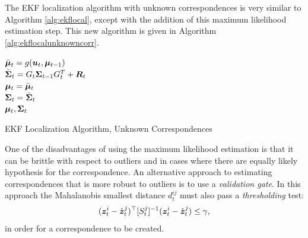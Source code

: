 The EKF localization algorithm with unknown correspondences is very similar to Algorithm \ref{alg:ekflocal}, except with the addition of this maximum likelihood estimation step. This new algorithm is given in Algorithm \ref{alg:ekflocalunknowncorr}.
\begin{algorithm}[ht]
 $\bar{\bm{\mu}}_t = g(\bm{u}_t,\bm{\mu}_{t-1})$\\
 $\bar{\bm{\Sigma}}_t = G_t\bm{\Sigma}_{t-1} G_t^{T} + \bm{R}_t$\\
 $\bm{\mu}_t = \bar{\bm{\mu}}_t$\\
 $\bm{\Sigma}_t = \bar{\bm{\Sigma}}_t$\\
 \Return $\bm{\mu}_t, \bm{\Sigma}_t$
 \caption{EKF Localization Algorithm, Unknown Correspondences}
 \label{alg:ekflocalunknowncorr}
\end{algorithm}


One of the disadvantages of using the maximum likelihood estimation is that it can be brittle with respect to outliers and in cases where there are equally likely hypothesis for the correspondence.
An alternative approach to estimating correspondences that is more robust to outliers is to use a \textit{validation gate}. In this approach the Mahalanobis smallest distance $d_t^{ij}$ must also pass a \textit{thresholding} test:
\begin{equation*}
(\bm{z}_t^i-\hat{\bm{z}}^{j}_t)^\top  [S_t^{j}]^{-1} (\bm{z}_t^i-\hat{\bm{z}}^{j}_t) \leq \gamma,
\end{equation*}
in order for a correspondence to be created.



